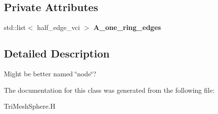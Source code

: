 \subsection*{Private Attributes}
\begin{CompactItemize}
\item 
std::list$<$ half\_\-edge\_\-vci $>$ \textbf{A\_\-one\_\-ring\_\-edges}\label{classSimSite3D_1_1geometry_1_1vertex__t_9d8c7fb281ada6fd0369cda6007d3f55}

\end{CompactItemize}


\subsection{Detailed Description}
Might be better named \char`\"{}node\char`\"{}? 



The documentation for this class was generated from the following file:\begin{CompactItemize}
\item 
Tri\-Mesh\-Sphere.H\end{CompactItemize}
